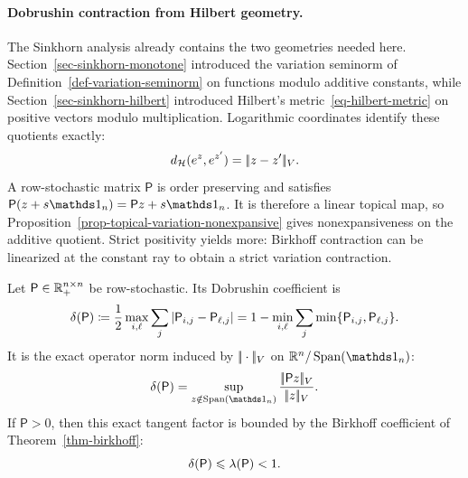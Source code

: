 \paragraph{Dobrushin contraction from Hilbert geometry.}

The Sinkhorn analysis already contains the two geometries needed here. Section~\ref{sec-sinkhorn-monotone} introduced the variation seminorm of Definition~\ref{def-variation-seminorm} on functions modulo additive constants, while Section~\ref{sec-sinkhorn-hilbert} introduced Hilbert's metric~\eqref{eq-hilbert-metric} on positive vectors modulo multiplication. Logarithmic coordinates identify these quotients exactly:
\[
	d_{\mathcal{H}}(e^z,e^{z'})=|\!| z-z' |\!|_V.
\]
A row-stochastic matrix $\mathsf P$ is order preserving and satisfies $\mathsf P(z+s\ones_n)=\mathsf Pz+s\ones_n$. It is therefore a linear topical map, so Proposition~\ref{prop-topical-variation-nonexpansive} gives nonexpansiveness on the additive quotient. Strict positivity yields more: Birkhoff contraction can be linearized at the constant ray to obtain a strict variation contraction.

\begin{prop}\label{prop-dobrushin-birkhoff-contraction}
	Let $\mathsf P\in\mathbb{R}_+^{n\times n}$ be row-stochastic. Its Dobrushin coefficient is
	\begin{equation}\label{eq-dobrushin-coefficient}
		\delta(\mathsf P)
		\coloneqq
		\frac12\max_{i,\ell}\sum_j\left\lvert\mathsf P_{i,j}-\mathsf P_{\ell,j}\right\rvert
		=
		1-\min_{i,\ell}\sum_j\min\{\mathsf P_{i,j},\mathsf P_{\ell,j}\}.
	\end{equation}
	It is the exact operator norm induced by $|\!| \cdot |\!|_V$ on $\RR^n/\Span(\ones_n)$:
	\begin{equation}\label{eq-dobrushin-exact-quotient-norm}
		\delta(\mathsf P)
		=
		\sup_{z\notin\Span(\ones_n)}
		\frac{\norm{\mathsf Pz}_V}{\norm{z}_V}.
	\end{equation}
	If $\mathsf P>0$, then this exact tangent factor is bounded by the Birkhoff coefficient of Theorem~\ref{thm-birkhoff}:
	\begin{equation}\label{eq-dobrushin-birkhoff-comparison}
		\delta(\mathsf P)\leqslant\lambda(\mathsf P)<1.
	\end{equation}
\end{prop}

